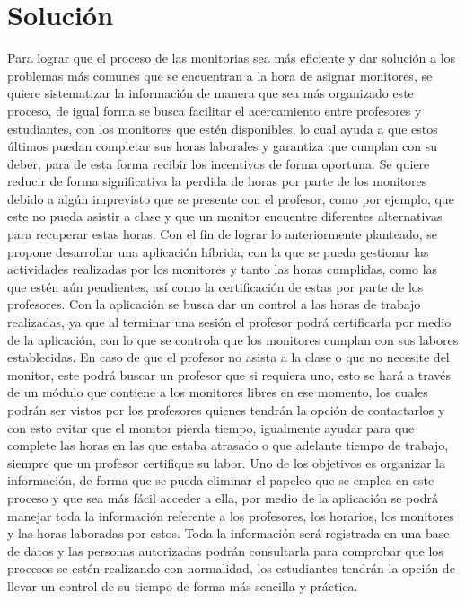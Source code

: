 \section{Solución}
Para lograr que el proceso de las monitorias sea más eficiente y dar solución a los problemas más comunes que se encuentran a la hora de asignar monitores, se quiere sistematizar la información de manera que sea más organizado este proceso, de igual forma se busca facilitar el acercamiento entre profesores y estudiantes, con los monitores que estén disponibles, lo cual ayuda a que estos últimos puedan completar sus horas laborales y garantiza que cumplan con su deber, para de esta forma recibir los incentivos de forma oportuna. Se quiere reducir de forma significativa la perdida de horas por parte de los monitores debido a algún imprevisto que se presente con el profesor, como por ejemplo, que este no pueda asistir a clase y que un monitor encuentre diferentes alternativas para recuperar estas horas.
\newline
\newline
Con el fin de lograr lo anteriormente planteado, se propone desarrollar una aplicación híbrida, con la que se pueda gestionar las actividades realizadas por los monitores y tanto las horas cumplidas, como las que estén aún pendientes, así como la certificación de estas por parte de los profesores. Con la aplicación se busca dar un control a las horas de trabajo realizadas, ya que al terminar una sesión el profesor podrá certificarla por medio de la aplicación, con lo que se controla que los monitores cumplan con sus labores establecidas. En caso de que el profesor no asista a la clase o que no necesite del monitor, este podrá buscar un profesor que si requiera uno, esto se hará a través de un módulo que contiene a los monitores libres en ese momento, los cuales podrán ser vistos por los profesores quienes tendrán la opción de contactarlos y con esto evitar que el monitor pierda tiempo, igualmente ayudar para que complete las horas en las que estaba atrasado o que adelante tiempo de trabajo, siempre que un profesor certifique su labor.
\newline
\newline
Uno de los objetivos es organizar la información, de forma que se pueda eliminar el papeleo que se emplea en este proceso y que sea más fácil acceder a ella, por medio de la aplicación se podrá manejar toda la información referente a los profesores, los horarios, los monitores y las horas laboradas por estos. Toda la información será registrada en una base de datos y las personas autorizadas podrán consultarla para comprobar que los procesos se estén realizando con normalidad, los estudiantes tendrán la opción de llevar un control de su tiempo de forma más sencilla y práctica.
\newpage
